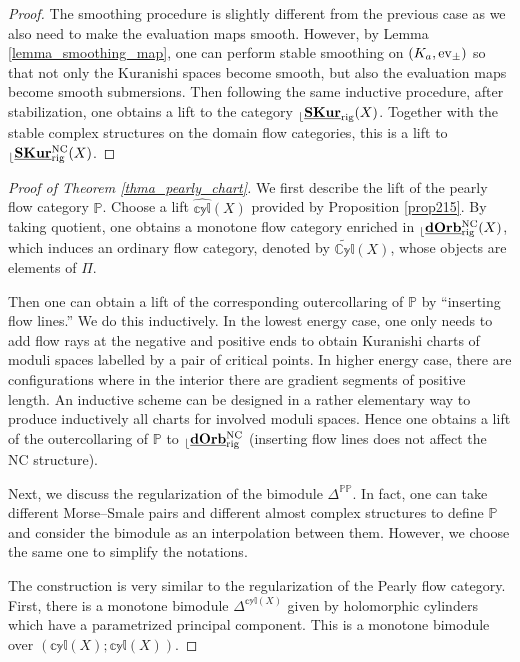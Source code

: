 \documentclass[reqno, 10pt]{amsart}
\numberwithin{equation}{section}
\numberwithin{equation}{section}
\theoremstyle{definition}
\theoremstyle{remark}
\newcommand{\mb}{\mathbb}
\renewcommand{\outer}{{}_{\lfloor}}
\newcommand{\uds}[1]{\underline{\smash{#1}}}
\newcommand{\ev}{{\rm ev}}
\begin{document}
\begin{proof}
The smoothing procedure is slightly different from the previous case as we also need to make the evaluation maps smooth. However, by Lemma \ref{lemma_smoothing_map}, one can perform stable smoothing on $(K_a, \ev_\pm)$ so that not only the Kuranishi spaces become smooth, but also the evaluation maps become smooth submersions. Then following the same inductive procedure, after stabilization, one obtains a lift to the category $\outer\uds{\bf SKur}_{\rm rig} (X)$. Together with the stable complex structures on the domain flow categories, this is a lift to $\outer \uds{\bf SKur}_{\rm rig}^{\rm NC}(X)$.
\end{proof}

\begin{proof}[Proof of Theorem \ref{thma_pearly_chart}]
We first describe the lift of the pearly flow category ${\mb P}$. Choose a lift $\widehat{\mb{cyl}}  (X)$ provided by Proposition \ref{prop215}. By taking quotient, one obtains a monotone flow category enriched in $\outer\uds{\bf dOrb}^{\rm NC}_{\rm rig}(X)$, which induces an ordinary flow category, denoted by $\widetilde{\mb{Cyl}} (X)$, whose objects are elements of $\Pi$. 

Then one can obtain a lift of the corresponding outercollaring of ${\mb P}$ by ``inserting flow lines.'' We do this inductively. In the lowest energy case, one only needs to add flow rays at the negative and positive ends to obtain Kuranishi charts of moduli spaces labelled by a pair of critical points. In higher energy case, there are configurations where in the interior there are gradient segments of positive length. An inductive scheme can be designed in a rather elementary way to produce inductively all charts for involved moduli spaces. Hence one obtains a lift of the outercollaring of ${\mb P}$ to $\outer \uds{\bf dOrb}_{\rm rig}^{\rm NC}$ (inserting flow lines does not affect the NC structure).

Next, we discuss the regularization of the bimodule $\mb{\Delta}^{\mb{PP}}$. In fact, one can take different Morse--Smale pairs and different almost complex structures to define $\mb{P}$ and consider the bimodule as an interpolation between them. However, we choose the same one to simplify the notations.

The construction is very similar to the regularization of the Pearly flow category. First, there is a monotone bimodule $\mb{\Delta}^{\mb{cyl}  (X)}$ given by holomorphic cylinders which have a parametrized principal component. This is a monotone bimodule over $(\mb{cyl} (X); \mb{cyl}  (X))$. 


\end{proof}
\end{document}
